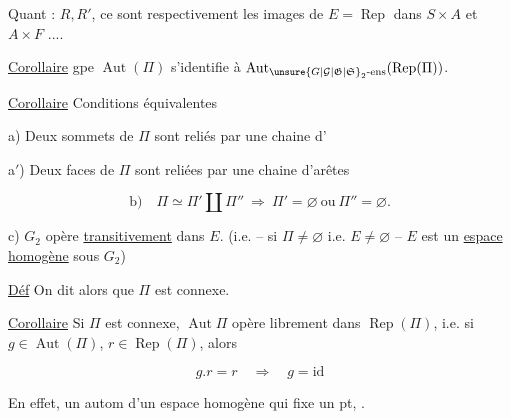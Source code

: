 
Quant : $R,R'$, ce sont respectivement les images de $E=\operatorname{Rep}$ dans $S\times A$ et $A\times F$ ....

\uline{Corollaire}  gpe $\operatorname{Aut}(\Pi)$ s'identifie à $\operatorname{Aut}_{\unsure{G|\mathcal G|\mathfrak G|\mathfrak S}_2\text{-ens}}(\operatorname{Rep}(\Pi))$.

\uline{Corollaire} Conditions équivalentes

a) Deux sommets de $\Pi$ sont  reliés par une chaine d'

a$'$) Deux faces de $\Pi$ sont  reliées par une chaine d'arêtes

\[
 \text{b)}\quad\Pi\simeq\Pi'\amalg\Pi''\ \Longrightarrow\ \Pi'=\varnothing\ \text{ou}\ \Pi''=\varnothing.
\]

c)  $G_2$ opère \uline{transitivement} dans $E$. (i.e. -- si $\Pi\ne\varnothing$ i.e. $E\ne\varnothing$ \deleted{\unsure{\}}} -- $E$ est un \uline{espace homogène} sous $G_2$)

 \uline{Déf} On dit alors que $\Pi$ est connexe.

\uline{Corollaire} Si $\Pi$ est connexe, $\operatorname{Aut}\Pi$ opère librement dans $\operatorname{Rep}(\Pi)$, i.e. si $g\in\operatorname{Aut}(\Pi)$, $r\in\operatorname{Rep}(\Pi)$, alors

\[
 g.r=r\quad\Longrightarrow\quad g=\mathrm{id}
\]

En effet, un autom d'un espace homogène qui fixe un pt,  .


